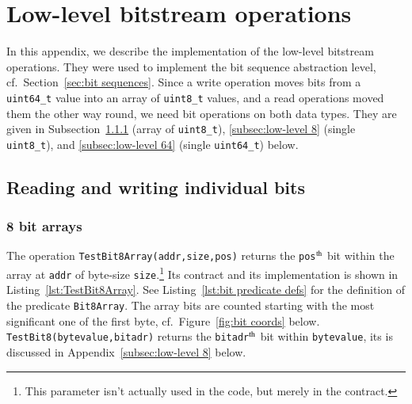 
\chapter{Low-level bitstream operations}
\label{cha:low-level bitstream}

In this appendix, we describe the implementation of the
low-level bitstream operations.
%
They were used to implement the bit sequence abstraction level, cf.\
Section~\ref{sec:bit sequences}.
%
Since a write operation moves bits from a \lstinline{uint64_t} value into an array of
\lstinline{uint8_t} values, and a read operations moved them the other way round,
we need bit operations on both data types.
%
They are given in
Subsection~\ref{subsec:low-level 8 array} (array of \lstinline{uint8_t}), 
\ref{subsec:low-level 8} (single \lstinline{uint8_t}), and
\ref{subsec:low-level 64} (single \lstinline{uint64_t}) below.













\section{Reading and writing individual bits}


\subsection{8 bit arrays}
\label{subsec:low-level 8 array}









The operation \lstinline{TestBit8Array(addr,size,pos)} returns the
\lstinline{pos}$^{\mbox{\scriptsize th}}$ bit
within the array at \lstinline{addr}
of byte-size \lstinline{size}.\footnote{
	This parameter isn't actually used in the code, but merely in the contract.
}
Its contract and its implementation is shown in Listing~\ref{lst:TestBit8Array}.
%
See Listing~\ref{lst:bit predicate defs} for the definition of the predicate
\lstinline{Bit8Array}.
%
The array bits are counted starting with the most significant one of the first byte,
cf.\ Figure~\ref{fig:bit coords} below.
%
\lstinline{TestBit8(bytevalue,bitadr)} returns the 
\lstinline{bitadr}$^{\mbox{\scriptsize th}}$ bit
within \lstinline{bytevalue}, its is discussed in Appendix~\ref{subsec:low-level 8} below.








